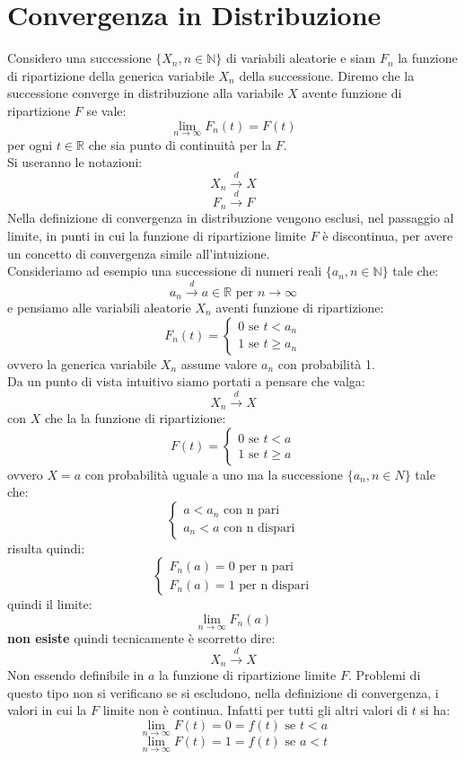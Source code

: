 \documentclass[a4paper,12pt, oneside]{book}
\newcommand{\numberset}{\mathbb}
\newcommand{\N}{\numberset{N}}
\newcommand{\R}{\numberset{R}}
\begin{document}
\section{Convergenza in Distribuzione}
Considero una successione $\{X_n, n\in\mathbb{N}\}$ di variabili aleatorie e siam $F_n$ la funzione di ripartizione della generica variabile $X_n$ della successione. Diremo che la successione converge in distribuzione alla variabile $X$ avente funzione di ripartizione $F$ se vale:
\[\lim_{n\to\infty}F_n(t)=F(t)\]
per ogni $t\in\R$ che sia punto di continuità per la $F$. \\
Si useranno le notazioni:
\[X_n\stackrel{d}{\longrightarrow} X\]
\[F_n\stackrel{d}{\longrightarrow} F\]
Nella definizione di convergenza in distribuzione vengono esclusi, nel passaggio al limite, in punti in cui la funzione di ripartizione limite $F$ è discontinua, per avere un concetto di convergenza simile all'intuizione.\\
Consideriamo ad esempio una successione di numeri reali $\{a_n,n\in\N\}$ tale che:
\[a_n\stackrel{d}{\longrightarrow} a\in\R\mbox{ per }n\to\infty\]
e pensiamo alle variabili aleatorie $X_n$ aventi funzione di ripartizione:
\[F_n(t)=\begin{cases}
0\mbox{ se } t<a_n\\
1\mbox{ se } t\geq a_n
\end{cases}\]
ovvero la generica variabile $X_n$ assume valore $a_n$ con probabilità 1.\\
Da un punto di vista intuitivo siamo portati a pensare che valga:
\[X_n\stackrel{d}{\longrightarrow} X\]
con $X$ che la la funzione di ripartizione:
\[F(t)=\begin{cases}
0\mbox{ se } t<a\\
1\mbox{ se } t\geq a
\end{cases}\]
ovvero $X=a$ con probabilità uguale a uno ma la successione $\{a_n,n\in N\}$ tale che:
\[\begin{cases}
a<a_n\mbox{ con n pari}\\
a_n<a\mbox{ con n dispari}
\end{cases}\]
risulta quindi:
\[\begin{cases}
F_n(a)=0\mbox{ per n pari}\\
F_n(a)=1\mbox{ per n dispari}
\end{cases}
\]
quindi il limite:
\[\lim_{n\to\infty}F_n(a)\]
\textbf{non esiste} quindi tecnicamente è scorretto dire:
\[X_n\stackrel{d}{\longrightarrow} X\]
Non essendo definibile in $a$ la funzione di ripartizione limite $F$. Problemi di questo tipo non si verificano se si escludono, nella definizione di convergenza, i valori in cui la $F$ limite non è continua. Infatti per tutti gli altri valori di $t$ si ha:
\[
\lim_{n\to\infty}F(t)=0=f(t) \mbox{ se }t<a
\]\[
\lim_{n\to\infty}F(t)=1=f(t) \mbox{ se }a<t
\]
\end{document}
